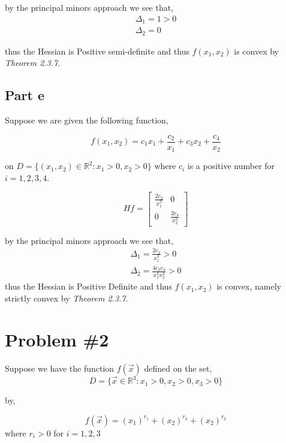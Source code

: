 \documentclass{article}
\newcommand{\RR}{\mathbb{R}}
\begin{document}
by the principal minors approach we see that,
\begin{align*}
    \Delta_1 = 1 > 0 \\
    \Delta_2 = 0 
\end{align*}

thus the Hessian is Positive semi-definite and thus $f(x_1,x_2)$ is convex by \textit{Theorem 2.3.7}.

\subsection*{Part e}
Suppose we are given the following function,

\begin{equation*}
    f(x_1,x_2) = c_1x_1 + \frac{c_2}{x_1} +c_3x_2 + \frac{c_4}{x_2}
\end{equation*}

on $D = \{(x_1,x_2) \in \RR^2 : x_1 > 0, x_2 > 0\}$ where $c_i$ is a positive number for $i=1,2,3,4$.

\begin{equation*}
    Hf = \begin{bmatrix*}
        \frac{2c_2}{x_1^3} & 0 \\
        0 &  \frac{2c_4}{x_2^3}
    \end{bmatrix*}
\end{equation*}

by the principal minors approach we see that,
\begin{align*}
    \Delta_1 =  \frac{2c_2}{x_1^3} > 0 \\
    \Delta_2 = \frac{4c_2c_4}{x_1^3x_2^3} > 0
\end{align*}
thus the Hessian is Positive Definite and thus $f(x_1,x_2)$ is convex, namely strictly convex by \textit{Theorem 2.3.7}.

\section*{Problem \#2}
Suppose we have the function $f(\vec{x})$ defined on the set,
\begin{equation*}
    D = \{\vec{x} \in \RR^3: x_1 >0, x_2 > 0, x_3 > 0\}
\end{equation*}

by,

\begin{equation*}
    f(\vec{x}) = (x_1)^{r_1} + (x_2)^{r_2} + (x_2)^{r_2}
\end{equation*}
where $r_i > 0$ for $i = 1,2,3$
\end{document}
